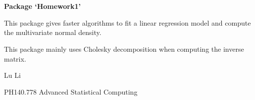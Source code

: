 \documentclass[a4paper]{book}
\begin{document}
\chapter*{}
\begin{center}
{\textbf{\huge Package `Homework1'}}
\par\bigskip{\large \today}
\end{center}
\begin{description}
\raggedright{}
\item[Type]
\item[Title]
\item[Version]
\item[Date]
\item[Author]
\item[Maintainer]\AsIs{}
\item[Description]
\item[License]
\end{description}
%
\begin{Description}\relax


This package gives faster algorithms to fit a linear regression model and compute the multivariate normal density.
\end{Description}
%
\begin{Details}\relax



This package mainly uses Cholesky decomposition when computing the inverse matrix.  
\end{Details}
%
\begin{Author}\relax

Lu Li
\end{Author}
%
\begin{References}\relax

PH140.778 Advanced Statistical Computing
\end{References}
\end{document}

